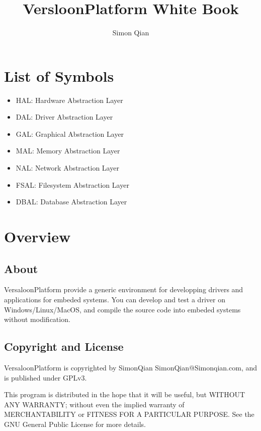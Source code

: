 \documentclass[a4paper,12pt]{book}
\title{VersloonPlatform White Book}
\author{Simon Qian}
\date{}
\begin{document}
\dominitoc

\maketitle

\tableofcontents
\listoffigures
\listoftables

\newpage
\chapter*{List of Symbols\hfill} %

\begin{itemize}
\item HAL: Hardware Abstraction Layer
\item DAL: Driver Abstraction Layer
\item GAL: Graphical Abstraction Layer
\item MAL: Memory Abstraction Layer
\item NAL: Network Abstraction Layer
\item FSAL: Filesystem Abstraction Layer
\item DBAL: Database Abstraction Layer
\end{itemize}

\chapter{Overview}
\minitoc

\newpage
\section{About}
VersaloonPlatform provide a generic environment for developping drivers and applications for embeded systems. You can develop and test a driver on Windows/Linux/MacOS, and compile the source code into embeded systems without modification.

\newpage
\section{Copyright and License}
VersaloonPlatform is copyrighted by SimonQian SimonQian@Simonqian.com, and is published under GPLv3.

This program is distributed in the hope that it will be useful, but WITHOUT ANY WARRANTY; without even the implied warranty of MERCHANTABILITY or FITNESS FOR A PARTICULAR PURPOSE.  See the GNU General Public License for more details.
\end{document}
